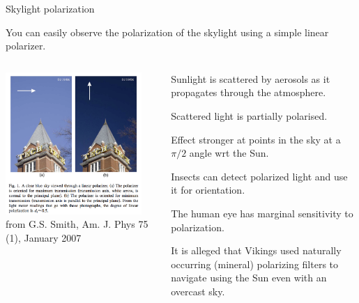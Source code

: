 %
%
%

\begin{frame}{Skylight polarization}

You can easily observe the polarization of the skylight using a simple linear polarizer.

\begin{columns}
  \begin{column}{0.47\textwidth}
    \begin{center}
       \includegraphics[width=0.90\textwidth]{./images/photos/skylight_polarization.png}\\
       {\tiny
           from G.S. Smith, Am. J. Phys 75 (1), January 2007
       }
    \end{center}
  \end{column}
  \begin{column}{0.53\textwidth}
      \begin{itemize}
       {\small
         \item Sunlight is scattered by aerosols as it propagates through the atmosphere.
         \item Scattered light is partially polarised.
         \item Effect stronger at points in the sky at a $\pi/2$ angle wrt the Sun.
         \item Insects can detect polarized light and use it for orientation.
         \item The human eye has marginal sensitivity to polarization.
         \item It is alleged that Vikings used naturally occurring (mineral) polarizing filters
                   to navigate using the Sun even with an overcast sky.
       }
      \end{itemize}
  \end{column}
\end{columns}

\end{frame}

